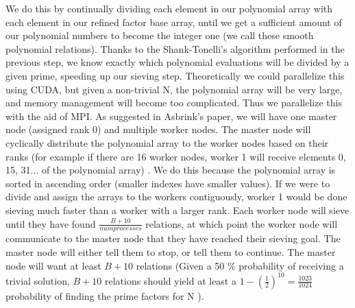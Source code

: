 \documentclass[11pt,twocolumn]{article}
\begin{document}
We do this by continually dividing each element in our polynomial array with each element in our refined factor base array, until we get a sufficient amount of our polynomial numbers to become the integer one (we call these smooth polynomial relations). Thanks to the Shank-Tonelli's algorithm performed in the previous step, we know exactly which polynomial evaluations will be divided by a given prime, speeding up our sieving step. Theoretically we could parallelize this using CUDA, but given a non-trivial N, the polynomial array will be very large, and memory management will become too complicated. Thus we parallelize this with the aid of MPI. As suggested in Asbrink's paper, we will have one master node (assigned rank 0) and multiple worker nodes. The master node will cyclically distribute the polynomial array to the worker nodes based on their ranks (for example if there are 16 worker nodes, worker 1 will receive elements 0, 15, 31... of the polynomial array) \cite{asbrink:parallelqs}. We do this because the polynomial array is sorted in ascending order (smaller indexes have smaller values). If we were to divide and assign the arrays to the workers contiguously, worker 1 would be done sieving much faster than a worker with a larger rank. Each worker node will sieve until they have found $\frac{B+10}{numprocesses}$ relations, at which point the worker node will communicate to the master node that they have reached their sieving goal. The master node will either tell them to stop, or tell them to continue. The master node will want at least $B+10$ relations (Given a 50 \% probability of receiving a trivial solution, $B+10$ relations should yield at least a $1 - \left(\frac{1}{2} \right)^{10} = \frac{1023}{1024}$ probability of finding the prime factors for N \cite{asbrink:parallelqs}).
\end{document}
